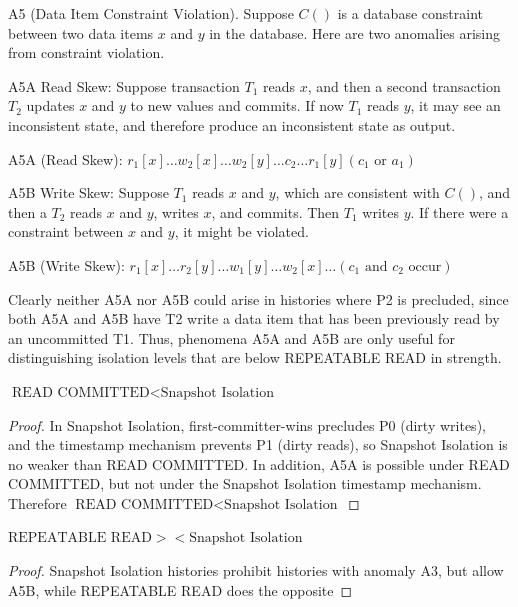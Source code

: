 \documentclass[11pt]{article}
\begin{document}
A5 (Data Item Constraint Violation). Suppose \(C()\) is a database constraint between two data items
\(x\) and \(y\) in the database. Here are two anomalies arising from constraint violation.

A5A Read Skew: Suppose transaction \(T_1\) reads \(x\), and then a second transaction \(T_2\) updates
\(x\) and \(y\) to new values and commits. If now \(T_1\) reads \(y\), it may see an inconsistent
state, and therefore produce an inconsistent state as output.
\begin{center}
A5A (Read Skew): \(r_1[x]\dots w_2[x]\dots w_2[y]\dots c_2\dots r_1[y](c_1\text{ or }a_1)\)
\end{center}

A5B Write Skew: Suppose \(T_1\) reads \(x\) and \(y\), which are consistent with \(C()\), and then a
\(T_2\) reads \(x\) and \(y\), writes \(x\), and commits. Then \(T_1\) writes \(y\). If there were a
constraint between \(x\) and \(y\), it might be violated.
\begin{center}
A5B (Write Skew): \(r_1[x]\dots r_2[y]\dots w_1[y]\dots w_2[x]\dots(c_1\text{ and }c_2\text{ occur})\)
\end{center}

Clearly neither A5A nor A5B could arise in histories where P2 is precluded, since both A5A and A5B
have T2 write a data item that has been previously read by an uncommitted T1. Thus, phenomena A5A and
A5B are only useful for distinguishing isolation levels that are below REPEATABLE READ in strength.

\begin{proposition}[]
\(\text{READ COMMITTED}<\text{Snapshot Isolation}\)
\end{proposition}

\begin{proof}
In Snapshot Isolation, first-committer-wins precludes P0 (dirty writes), and the timestamp mechanism
prevents P1 (dirty reads), so Snapshot Isolation is no weaker than READ COMMITTED. In addition, A5A is
possible under READ COMMITTED, but not under the Snapshot Isolation timestamp mechanism. Therefore
\(\text{READ COMMITTED}<\text{Snapshot Isolation}\)
\end{proof}

\begin{proposition}[]
\(\text{REPEATABLE READ}><\text{Snapshot Isolation}\)
\end{proposition}

\begin{proof}
Snapshot Isolation histories prohibit histories with anomaly A3, but allow A5B, while REPEATABLE READ does the opposite
\end{proof}
\end{document}
